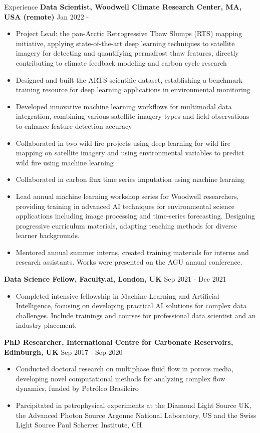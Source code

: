 \documentclass{resume} %
\begin{document}
\begin{rSection}{Experience}
{\bf Data Scientist, Woodwell Climate Research Center, MA, USA (remote)} \hfill {Jan 2022 - } 

\begin{itemize}
    \item Project Lead: the pan-Arctic Retrogressive Thaw Slumps (RTS) mapping initiative, applying state-of-the-art deep learning techniques to satellite imagery for detecting and quantifying permafrost thaw features, directly contributing to climate feedback modeling and carbon cycle research
    \item Designed and built the ARTS scientific dataset, establishing a benchmark training resource for deep learning applications in environmental monitoring
    \item Developed innovative machine learning workflows for multimodal data integration, combining various satellite imagery types and field observations to enhance feature detection accuracy
    \item Collaborated in two wild fire projects using deep learning for wild fire mapping on satellite imagery and using environmental variables to predict wild fire using machine learning
    \item Collaborated in carbon flux time series imputation using machine learning
    \item Lead annual machine learning workshop series for Woodwell researchers, providing training in advanced AI techniques for environmental science applications including image processing and time-series forecasting. Designing progressive curriculum materials, adapting teaching methods for diverse learner backgrounds.
    \item Mentored annual summer interns, created training materials for interns and research assistants. Works were presented on the AGU annual conference.
\end{itemize}

{\bf Data Science Fellow, Faculty.ai, London, UK} \hfill {Sep 2021 - Dec 2021}
\begin{itemize}
    \item Completed intensive fellowship in Machine Learning and Artificial Intelligence, focusing on developing practical AI solutions for complex data challenges. Include trainings and courses for professional data scientist and an industry placement.
\end{itemize}

{\bf PhD Researcher, International Centre for Carbonate Reservoirs, Edinburgh, UK}
\hfill{Sep 2017 - Sep 2020}
\begin{itemize}
    \item Conducted doctoral research on multiphase fluid flow in porous media, developing novel computational methods for analyzing complex flow dynamics, funded by Petróleo Brasileiro
    \item Parcipitated in petrophysical experiments at the Diamond Light Source UK, the Advanced Photon Source Argonne National Laboratory, US and the Swiss Light Source Paul Scherrer Institute, CH
\end{itemize}
\end{rSection}
\end{document}
